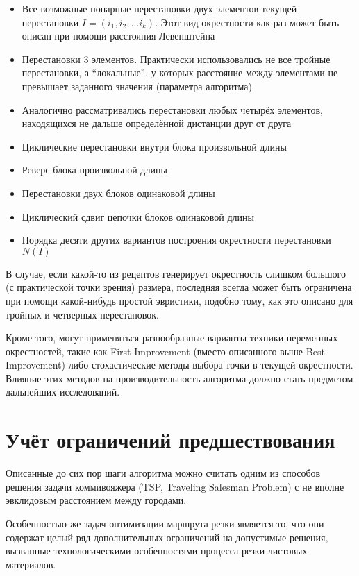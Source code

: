 \documentclass{article}
\begin{document}
\begin{itemize}
    \item Все возможные попарные перестановки двух элементов текущей перестановки $I=(i_1, i_2, \dots i_k)$.
    Этот вид окрестности как раз может быть описан при помощи расстояния Левенштейна
    \item Перестановки 3 элементов.
    Практически использовались не все тройные перестановки,
    а ``локальные'',
    у которых расстояние между элементами не превышает
    заданного значения
    (параметра алгоритма)
    \item Аналогично рассматривались перестановки любых
    четырёх элементов,
    находящихся не дальше определённой дистанции
    друг от друга
    \item Циклические перестановки внутри блока произвольной длины
    \item Реверс блока произвольной длины
    \item Перестановки двух блоков одинаковой длины
    \item Циклический сдвиг цепочки блоков одинаковой длины
    \item Порядка десяти других вариантов построения окрестности перестановки $N(I)$
\end{itemize}

В случае,
если какой-то из рецептов генерирует
окрестность слишком большого 
(с практической точки зрения)
размера,
последняя всегда может быть
ограничена при помощи какой-нибудь простой эвристики,
подобно тому,
как это описано для 
тройных и четверных перестановок.

Кроме того,
могут применяться разнообразные варианты
техники переменных окрестностей,
такие как
First Improvement
(вместо описанного выше Best Improvement)
либо стохастические методы выбора
точки в текущей окрестности.
Влияние этих методов
на производительность алгоритма
должно стать предметом дальнейших исследований.

\section{Учёт ограничений предшествования}

Описанные до сих пор шаги алгоритма 
можно считать одним из способов решения
задачи коммивояжера
(TSP, Traveling Salesman Problem)
с не вполне эвклидовым расстоянием
между городами.

Особенностью же задач оптимизации
маршрута резки является то,
что они содержат целый ряд дополнительных
ограничений на допустимые решения,
вызванные технологическими особенностями
процесса резки листовых материалов.
\end{document}
